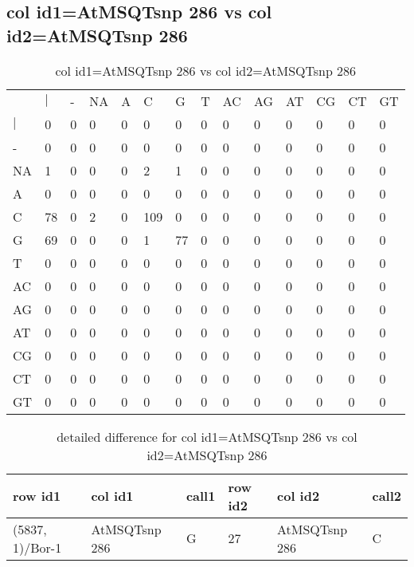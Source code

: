 \subsection{col id1=AtMSQTsnp 286 vs col id2=AtMSQTsnp 286}
\begin{center}
\begin{longtable}{|l|l|l|l|l|l|l|l|l|l|l|l|l|l|}
\caption{col id1=AtMSQTsnp 286 vs col id2=AtMSQTsnp 286} \label{table_dm822}\\
\hline
\\
\hline
&$|$&-&NA&A&C&G&T&AC&AG&AT&CG&CT&GT\\
$|$&0&0&0&0&0&0&0&0&0&0&0&0&0\\
-&0&0&0&0&0&0&0&0&0&0&0&0&0\\
NA&1&0&0&0&2&1&0&0&0&0&0&0&0\\
A&0&0&0&0&0&0&0&0&0&0&0&0&0\\
C&78&0&2&0&109&0&0&0&0&0&0&0&0\\
G&69&0&0&0&1&77&0&0&0&0&0&0&0\\
T&0&0&0&0&0&0&0&0&0&0&0&0&0\\
AC&0&0&0&0&0&0&0&0&0&0&0&0&0\\
AG&0&0&0&0&0&0&0&0&0&0&0&0&0\\
AT&0&0&0&0&0&0&0&0&0&0&0&0&0\\
CG&0&0&0&0&0&0&0&0&0&0&0&0&0\\
CT&0&0&0&0&0&0&0&0&0&0&0&0&0\\
GT&0&0&0&0&0&0&0&0&0&0&0&0&0\\
\hline
\end{longtable}
\end{center}

\begin{center}
\begin{longtable}{|l|l|l|l|l|l|}
\caption{detailed difference for col id1=AtMSQTsnp 286 vs col id2=AtMSQTsnp 286} \label{table_dm823}\\
\hline
row id1&col id1&call1&row id2&col id2&call2\\
\hline
(5837, 1)/Bor-1&AtMSQTsnp 286&G&27&AtMSQTsnp 286&C\\
\hline
\end{longtable}
\end{center}

